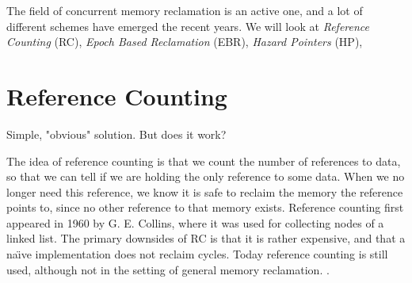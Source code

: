 \documentclass[a4paper,twoside]{report}
\begin{document}
The field of concurrent memory reclamation is an active one, and a lot of
different schemes have emerged the recent years. We will look at
\emph{Reference Counting} (RC),
\emph{Epoch Based Reclamation} (EBR),
\emph{Hazard Pointers} (HP),




\section{Reference Counting}
Simple, "obvious" solution. But does it work?

 The idea of reference counting is that we count the number of references
to data, so that we can tell if we are holding the only reference to some
data.  When we no longer need this reference, we know it is safe to reclaim the
memory the reference points to, since no other reference to that memory
exists.  Reference counting first appeared in 1960 by G. E.
Collins\cite{collins1960method}, where it was used for collecting nodes of a
linked list.  The primary downsides of RC is that it is rather expensive, and
that a na\"\i{}ve implementation does not reclaim cycles.  Today reference
counting is still used, although not in the setting of general memory
reclamation.  .

%
\end{document}
